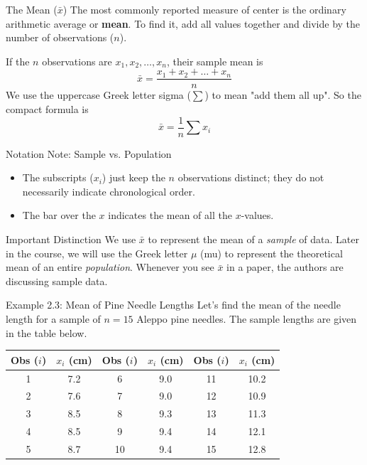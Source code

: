 \documentclass[aspectratio=169]{beamer}
\begin{document}
\begin{frame}{The Mean ($\bar{x}$)}
The most commonly reported measure of center is the ordinary arithmetic average or \textbf{mean}. To find it, add all values together and divide by the number of observations ($n$).

\vspace{0.2cm}

If the $n$ observations are $x_1, x_2, \dots, x_n$, their sample mean is
$$ \bar{x} = \frac{x_1 + x_2 + \dots + x_n}{n} $$
We use the uppercase Greek letter sigma ($\sum$) to mean "add them all up". So the compact formula is
$$ \bar{x} = \frac{1}{n} \sum x_i $$
\end{frame}

\begin{frame}{Notation Note: Sample vs. Population}
\begin{itemize}
	\item The subscripts ($x_i$) just keep the $n$ observations distinct; they do not necessarily indicate chronological order.
	\item The bar over the $x$ indicates the mean of all the $x$-values.
\end{itemize}
\vspace{0.3cm}
\begin{alertblock}{Important Distinction}
We use $\bar{x}$ to represent the mean of a \emph{sample} of data. Later in the course, we will use the Greek letter $\mu$ (mu) to represent the theoretical mean of an entire \emph{population}. Whenever you see $\bar{x}$ in a paper, the authors are discussing sample data.
\end{alertblock}
\end{frame}


\begin{frame}{Example 2.3: Mean of Pine Needle Lengths}
Let's find the mean of the needle length for a sample of $n = 15$ Aleppo pine needles. The sample lengths are given in the table below.
\vspace{0.2cm}
\begin{table}
\centering
\scriptsize
\begin{tabular}{cc|cc|cc}
\toprule
\textbf{Obs ($i$)} & \textbf{$x_i$ (cm)} & \textbf{Obs ($i$)} & \textbf{$x_i$ (cm)} & \textbf{Obs ($i$)} & \textbf{$x_i$ (cm)} \\
\midrule
1 & 7.2 & 6 & 9.0 & 11 & 10.2 \\
2 & 7.6 & 7 & 9.0 & 12 & 10.9 \\
3 & 8.5 & 8 & 9.3 & 13 & 11.3 \\
4 & 8.5 & 9 & 9.4 & 14 & 12.1 \\
5 & 8.7 & 10 & 9.4 & 15 & 12.8 \\
\bottomrule
\end{tabular}
\end{table}
\end{frame}
\end{document}
